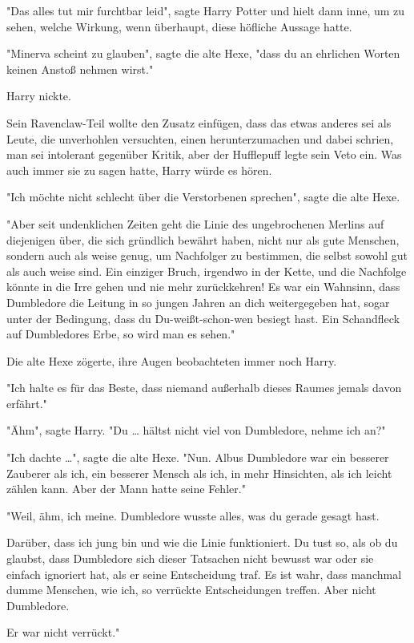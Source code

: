 {"Das alles tut mir furchtbar leid", sagte Harry Potter und hielt dann inne, um zu sehen, welche Wirkung, wenn überhaupt, diese höfliche Aussage hatte.

"Minerva scheint zu glauben", sagte die alte Hexe, "dass du an ehrlichen Worten keinen Anstoß nehmen wirst."

Harry nickte.

Sein Ravenclaw-Teil wollte den Zusatz einfügen, dass das etwas anderes sei als Leute, die unverhohlen versuchten, einen herunterzumachen und dabei schrien, man sei intolerant gegenüber Kritik, aber der Hufflepuff legte sein Veto ein. Was auch immer sie zu sagen hatte, Harry würde es hören.

"Ich möchte nicht schlecht über die Verstorbenen sprechen", sagte die alte Hexe.

"Aber seit undenklichen Zeiten geht die Linie des ungebrochenen Merlins auf diejenigen über, die sich gründlich bewährt haben, nicht nur als gute Menschen, sondern auch als weise genug, um Nachfolger zu bestimmen, die selbst sowohl gut als auch weise sind. Ein einziger Bruch, irgendwo in der Kette, und die Nachfolge könnte in die Irre gehen und nie mehr zurückkehren! Es war ein Wahnsinn, dass Dumbledore die Leitung in so jungen Jahren an dich weitergegeben hat, sogar unter der Bedingung, dass du Du-weißt-schon-wen besiegt hast. Ein Schandfleck auf Dumbledores Erbe, so wird man es sehen."

Die alte Hexe zögerte, ihre Augen beobachteten immer noch Harry.

"Ich halte es für das Beste, dass niemand außerhalb dieses Raumes jemals davon erfährt."

"Ähm", sagte Harry. "Du … hältst nicht viel von Dumbledore, nehme ich an?"

"Ich dachte …", sagte die alte Hexe. "Nun. Albus Dumbledore war ein besserer Zauberer als ich, ein besserer Mensch als ich, in mehr Hinsichten, als ich leicht zählen kann. Aber der Mann hatte seine Fehler."

"Weil, ähm, ich meine. Dumbledore wusste alles, was du gerade gesagt hast.

Darüber, dass ich jung bin und wie die Linie funktioniert. Du tust so, als ob du glaubst, dass Dumbledore sich dieser Tatsachen nicht bewusst war oder sie einfach ignoriert hat, als er seine Entscheidung traf. Es ist wahr, dass manchmal dumme Menschen, wie ich, so verrückte Entscheidungen treffen. Aber nicht Dumbledore.

Er war nicht verrückt."

}
